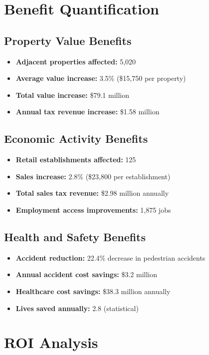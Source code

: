 \documentclass[11pt,letterpaper]{report}
\begin{document}
\section{Benefit Quantification}

\subsection{Property Value Benefits}
\begin{itemize}
    \item \textbf{Adjacent properties affected:} 5,020
    \item \textbf{Average value increase:} 3.5\% (\$15,750 per property)
    \item \textbf{Total value increase:} \$79.1 million
    \item \textbf{Annual tax revenue increase:} \$1.58 million
\end{itemize}

\subsection{Economic Activity Benefits}
\begin{itemize}
    \item \textbf{Retail establishments affected:} 125
    \item \textbf{Sales increase:} 2.8\% (\$23,800 per establishment)
    \item \textbf{Total sales tax revenue:} \$2.98 million annually
    \item \textbf{Employment access improvements:} 1,875 jobs
\end{itemize}

\subsection{Health and Safety Benefits}
\begin{itemize}
    \item \textbf{Accident reduction:} 22.4\% decrease in pedestrian accidents
    \item \textbf{Annual accident cost savings:} \$3.2 million
    \item \textbf{Healthcare cost savings:} \$38.3 million annually
    \item \textbf{Lives saved annually:} 2.8 (statistical)
\end{itemize}

\section{ROI Analysis}
\end{document}
